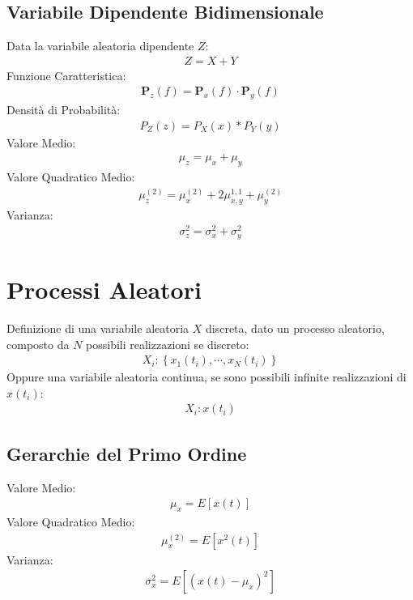 \documentclass{article}
\begin{document}
\subsection*{Variabile Dipendente Bidimensionale}
Data la variabile aleatoria dipendente $Z$:
\begin{gather*}
    Z=X+Y
\end{gather*}
Funzione Caratteristica:
\begin{gather*}
    \mathbf{P}_z(f)=\mathbf{P}_x(f)\cdot\mathbf{P}_y(f)
\end{gather*}
Densità di Probabilità:
\begin{gather*}
    P_Z(z)=P_X(x)*P_Y(y)
\end{gather*}
Valore Medio:
\begin{gather*}
    \mu_z=\mu_x+\mu_y
\end{gather*}
Valore Quadratico Medio:
\begin{gather*}
    \mu_z^{(2)}=\mu_x^{(2)}+2\mu_{x,y}^{1,1}+\mu_y^{(2)}
\end{gather*}
Varianza:
\begin{gather*}
    \sigma_z^2=\sigma_x^2+\sigma_y^2
\end{gather*}

\section{Processi Aleatori}
Definizione di una variabile aleatoria $X$ discreta, dato un processo aleatorio, composto da $N$ possibili realizzazioni se discreto:
\begin{gather*}
    X_i:\left\{x_1(t_i),\cdots,x_N(t_i)\right\}
\end{gather*}
Oppure una variabile aleatoria continua, se sono possibili infinite realizzazioni di $x(t_i)$:
\begin{gather*}
    X_i:x(t_i)
\end{gather*}
\subsection*{Gerarchie del Primo Ordine}
Valore Medio:
\begin{gather*}
    \mu_x=E[x(t)]
\end{gather*}
Valore Quadratico Medio:
\begin{gather*}
    \mu_x^{(2)}=E[x^2(t)]
\end{gather*}
Varianza:
\begin{gather*}
    \sigma_x^2=E[(x(t)-\mu_x)^2]
\end{gather*}
\end{document}
